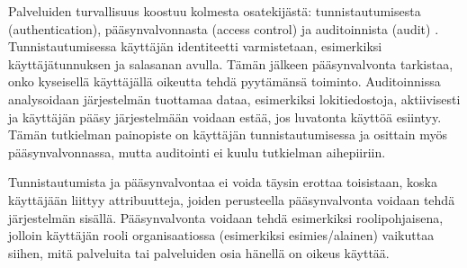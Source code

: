 Palveluiden turvallisuus koostuu kolmesta osatekijästä: tunnistautumisesta (authentication), pääsynvalvonnasta (access control) ja auditoinnista (audit) \cite{sandhu}. Tunnistautumisessa käyttäjän identiteetti varmistetaan, esimerkiksi käyttäjätunnuksen ja salasanan avulla. Tämän jälkeen pääsynvalvonta tarkistaa, onko kyseisellä käyttäjällä oikeutta tehdä pyytämänsä toiminto. Auditoinnissa analysoidaan järjestelmän tuottamaa dataa, esimerkiksi lokitiedostoja, aktiivisesti ja käyttäjän pääsy järjestelmään voidaan estää, jos luvatonta käyttöä esiintyy. Tämän tutkielman pai\-no\-pis\-te on käyttäjän tunnistautumisessa ja osittain myös pääsynvalvonnassa, mutta auditointi ei kuulu tutkielman aihepiiriin.

Tunnistautumista ja pääsynvalvontaa ei voida täysin erottaa toisistaan, koska käyttäjään liittyy attribuutteja, joiden perusteella pääsynvalvonta voidaan tehdä järjestelmän sisällä. Pääsynvalvonta voidaan tehdä esimerkiksi roolipohjaisena, jolloin käyttäjän rooli organisaatiossa (esimerkiksi esimies/alainen) vaikuttaa siihen, mitä palveluita tai palveluiden osia hänellä on oikeus käyttää.